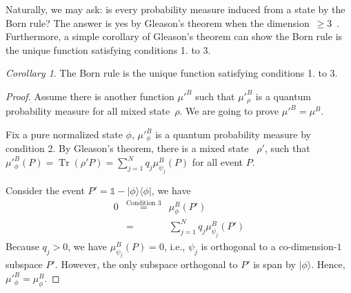 \documentclass{article}
\theoremstyle{remark}
\newtheorem{cor}{Corollary}
\newcommand{\Hilb}{\mathcal{H}}
\newcommand{\ket}[1]{|#1\rangle}
\newcommand{\proj}[1]{|#1 \rangle\langle #1 |}
\newcommand{\Tr}{\mathop{\mathrm{Tr}}\nolimits}
\begin{document}
Naturally, we may ask: is every probability measure induced from a
state by the Born rule? The answer is yes by Gleason's theorem when
the dimension~$\ge3$~\cite{gleason1957,peres1995quantum,Redhead1987-REDINA}.
Furthermore, a simple corollary of Gleason's theorem can show the
Born rule is the unique function satisfying conditions 1. to 3.
\begin{cor}
The Born rule is the unique function satisfying conditions 1. to 3.
\end{cor}
\begin{proof}
Assume there is another function $\mu'^B$ such that $\mu'^B_{\rho}$
is a quantum probability measure for all mixed state~$\rho$. We
are going to prove $\mu'^B=\mu^B$.

Fix a pure normalized state $\phi$, $\mu'^B_{\phi}$ is a quantum
probability measure by condition 2. By Gleason's theorem, there is
a mixed state ~$\rho'$, such that $\mu'^B_{\phi}\left(P\right)=\Tr\left(\rho'P\right)=\sum_{j=1}^{N}q_{j}\mu^B_{\psi_{j}}\left(P\right)$
for all event $P$. 

Consider the event $P'=\mathbb{1}-\proj{\phi}$, we have 
\begin{eqnarray*}
0 & \overset{\textrm{Condition 3}}{=} & \mu^B_{\phi}\left(P'\right)\\
 & = & \sum_{j=1}^{N}q_{j}\mu^B_{\psi_{j}}\left(P'\right)
\end{eqnarray*}
Because $q_{j}>0$, we have $\mu^B_{\psi_{j}}\left(P\right)=0$,
i.e., $\psi_{j}$ is orthogonal to a co-dimension-$1$ subspace $P'$.
However, the only subspace orthogonal to $P'$ is span by $\ket{\phi}$.
Hence, $\mu'^B_{\phi}=\mu^B_{\phi}$.
\end{proof}




\end{document}
